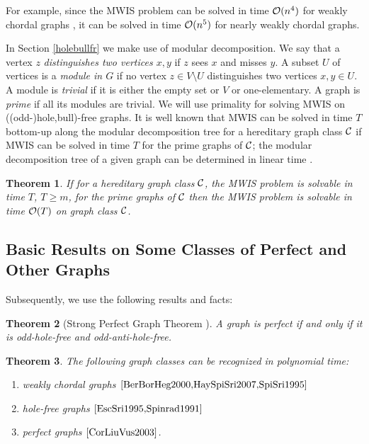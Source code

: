 \documentclass[11pt]{article}
\newcommand{\0}{\text{ has a co-join to }}
\newcommand{\1}{\text{ has a join to }}
\newtheorem{theo}{Theorem}
\begin{document}
For example, since the MWIS problem can be solved in time ${\cal O}(n^4)$ for weakly chordal graphs \cite{SpiSri1995}, it can be solved in time ${\cal O}(n^5)$ for nearly weakly chordal graphs.

In Section \ref{holebullfr} we make use of modular decomposition. We say that a vertex $z$ {\em distinguishes two vertices $x,y$} if $z$ sees $x$ and misses $y$. A subset $U$ of vertices is a {\em module in $G$} if no vertex $z \in V \setminus U$ distinguishes two vertices $x,y \in U$. A module is {\em trivial} if it is either the empty set or $V$ or one-elementary. A graph is {\em prime} if all its modules are trivial. We will use primality for solving MWIS on ((odd-)hole,bull)-free graphs. It is well known that MWIS can be solved in time $T$ bottom-up along the modular decomposition tree for a hereditary graph class ${\cal C}$ if MWIS can be solved in time $T$ for the prime graphs of ${\cal C}$; the modular decomposition tree of a given graph can be determined in linear time \cite{McCSpi1999}. 
    
\begin{theo}\label{MWISprimered}
If for a hereditary graph class ${\cal C}$, the MWIS problem is solvable in time $T$, $T \ge m$, for the prime graphs of ${\cal C}$ then the MWIS problem is solvable in time ${\cal O}(T)$ on graph class ${\cal C}$.
\end{theo} 

\subsection{Basic Results on Some Classes of Perfect and Other Graphs}

Subsequently, we use the following results and facts:

\begin{theo}[Strong Perfect Graph Theorem \cite{ChuRobSeyTho2006}]\label{SPGT}
A graph is perfect if and only if it is odd-hole-free and odd-anti-hole-free.
\end{theo}

\begin{theo}\label{basicrecprop}
The following graph classes can be recognized in polynomial time:
\begin{enumerate}
\item[$(i)$] weakly chordal graphs $\cite{BerBorHeg2000,HaySpiSri2007,SpiSri1995}$
\item[$(ii)$] hole-free graphs $\cite{EscSri1995,Spinrad1991}$ 
\item[$(iii)$] perfect graphs $\cite{CorLiuVus2003}$.
\end{enumerate}
\end{theo}
 
\end{document}
